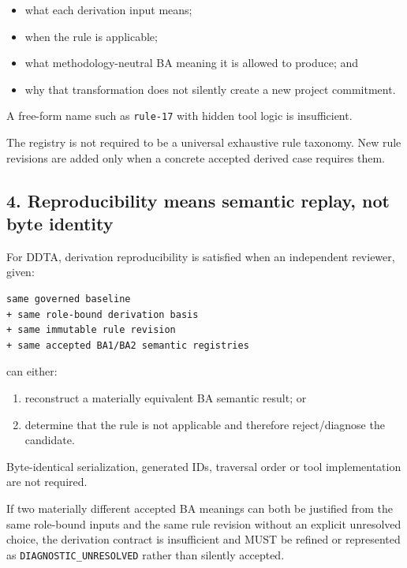 \documentclass[11pt,a4paper]{article}
\providecommand{\tightlist}{\setlength{\itemsep}{0pt}\setlength{\parskip}{0pt}}
\begin{document}
\begin{itemize}
\tightlist
\item
  what each derivation input means;
\item
  when the rule is applicable;
\item
  what methodology-neutral BA meaning it is allowed to produce; and
\item
  why that transformation does not silently create a new project
  commitment.
\end{itemize}

A free-form name such as \texttt{rule-17} with hidden tool logic is
insufficient.

The registry is not required to be a universal exhaustive rule taxonomy.
New rule revisions are added only when a concrete accepted derived case
requires them.

\subsection{4. Reproducibility means semantic replay, not byte
identity}\label{reproducibility-means-semantic-replay-not-byte-identity}

For DDTA, derivation reproducibility is satisfied when an independent
reviewer, given:

\begin{verbatim}
same governed baseline
+ same role-bound derivation basis
+ same immutable rule revision
+ same accepted BA1/BA2 semantic registries
\end{verbatim}

can either:

\begin{enumerate}
\def\labelenumi{\arabic{enumi}.}
\tightlist
\item
  reconstruct a materially equivalent BA semantic result; or
\item
  determine that the rule is not applicable and therefore
  reject/diagnose the candidate.
\end{enumerate}

Byte-identical serialization, generated IDs, traversal order or tool
implementation are not required.

If two materially different accepted BA meanings can both be justified
from the same role-bound inputs and the same rule revision without an
explicit unresolved choice, the derivation contract is insufficient and
MUST be refined or represented as \texttt{DIAGNOSTIC\_UNRESOLVED} rather
than silently accepted.
\end{document}
